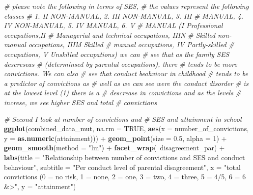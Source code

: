 \documentclass[]{tufte-handout}
\newenvironment{Shaded}{}{}
\newcommand{\KeywordTok}[1]{\textcolor[rgb]{0.00,0.44,0.13}{\textbf{#1}}}
\newcommand{\DataTypeTok}[1]{\textcolor[rgb]{0.56,0.13,0.00}{#1}}
\newcommand{\DecValTok}[1]{\textcolor[rgb]{0.25,0.63,0.44}{#1}}
\newcommand{\FloatTok}[1]{\textcolor[rgb]{0.25,0.63,0.44}{#1}}
\newcommand{\StringTok}[1]{\textcolor[rgb]{0.25,0.44,0.63}{#1}}
\newcommand{\CommentTok}[1]{\textcolor[rgb]{0.38,0.63,0.69}{\textit{#1}}}
\newcommand{\OtherTok}[1]{\textcolor[rgb]{0.00,0.44,0.13}{#1}}
\newcommand{\OperatorTok}[1]{\textcolor[rgb]{0.40,0.40,0.40}{#1}}
\newcommand{\NormalTok}[1]{#1}
\begin{document}
\begin{Shaded}
\begin{Highlighting}[]
\CommentTok{# please note the following in terms of SES,}
\CommentTok{# the values represent the following classes}
\CommentTok{# 1. II NON-MANUAL, 2. III NON-MANUAL, 3. III}
\CommentTok{# MANUAL, 4. IV NON-MANUAL, 5. IV MANUAL, 6. V}
\CommentTok{# MANUAL (I Professional occupations,II}
\CommentTok{# Managerial and technical occupations, IIIN}
\CommentTok{# Skilled non-manual occupations, IIIM Skilled}
\CommentTok{# manual occupations, IV Partly-skilled}
\CommentTok{# occupations, V Unskilled occupations) we can}
\CommentTok{# see that as the family SES descreseas}
\CommentTok{# (determinsed by parental occupations), there}
\CommentTok{# tends to be more convictions. We can also}
\CommentTok{# see that conduct beahviour in childhood}
\CommentTok{# tends to be a predictor of convictions as}
\CommentTok{# well as we can see were the conduct disorder}
\CommentTok{# is at the lowest level (1) there is a}
\CommentTok{# descrease in convictions and as the levels}
\CommentTok{# increse, we see higher SES and total}
\CommentTok{# convictions}

\CommentTok{# Second I look at number of convictions and}
\CommentTok{# SES and attainment in school}
\KeywordTok{ggplot}\NormalTok{(combined_data_mut, }\DataTypeTok{na.rm =} \OtherTok{TRUE}\NormalTok{, }\KeywordTok{aes}\NormalTok{(}\DataTypeTok{x =}\NormalTok{ number_of_convictions, }
    \DataTypeTok{y =} \KeywordTok{as.numeric}\NormalTok{(attainment))) }\OperatorTok{+}\StringTok{ }\KeywordTok{geom_point}\NormalTok{(}\DataTypeTok{size =} \FloatTok{0.5}\NormalTok{, }
    \DataTypeTok{alpha =} \DecValTok{1}\NormalTok{) }\OperatorTok{+}\StringTok{ }\KeywordTok{geom_smooth}\NormalTok{(}\DataTypeTok{method =} \StringTok{"lm"}\NormalTok{) }\OperatorTok{+}\StringTok{ }
\StringTok{    }\KeywordTok{facet_wrap}\NormalTok{(}\OperatorTok{~}\NormalTok{disagreement_par) }\OperatorTok{+}\StringTok{ }\KeywordTok{labs}\NormalTok{(}\DataTypeTok{title =} \StringTok{"Relationship between number of convictions and SES and conduct behaviour"}\NormalTok{, }
    \DataTypeTok{subtitle =} \StringTok{"Per conduct level of parental disagreement"}\NormalTok{, }
    \DataTypeTok{x =} \StringTok{"total convictions (0 = no risk, 1 = none, 2 = one, 3 = two, 4 = three, 5 = 4/5, 6 = 6 &>"}\NormalTok{, }
    \DataTypeTok{y =} \StringTok{"attainment"}\NormalTok{)}
\end{Highlighting}
\end{Shaded}
\end{document}
